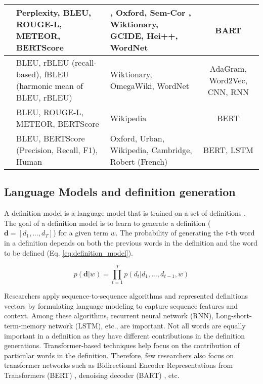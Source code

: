 \begin{longtable}{|c|p{3.5cm}|p{3.5cm}|c|}
    \hline
    \cite{bevilacqua_generationary_2020} & Perplexity, BLEU, ROUGE-L, METEOR, BERTScore                     & \cite{noraset_definition_2016}, Oxford, Sem-Cor \cite{miller_semantic_1993}, Wiktionary, GCIDE, Hei++, WordNet & BART                                     \\
    \hline
    \cite{kabiri_evaluating_2020}        & BLEU, rBLEU (recall-based), fBLEU (harmonic mean of BLEU, rBLEU) & Wiktionary, OmegaWiki, WordNet                                                                                  & AdaGram, Word2Vec, CNN, RNN              \\
    \hline
    \cite{huang_cdm_2021}                & BLEU, ROUGE-L, METEOR, BERTScore                                 & Wikipedia                                                                                                       & BERT                                     \\
    \hline
    \cite{reid_vcdm_2020}                & BLEU, BERTScore (Precision, Recall, F1), Human                   & Oxford, Urban, Wikipedia, Cambridge, Robert (French)                                                            & BERT, LSTM                               \\
    \hline
\end{longtable}

\subsection{Language Models and definition generation}
A definition model is a language model that is trained on a set of definitions
\cite{noraset_definition_2016}. The goal of a definition model is to learn to
generate a definition ($\textbf{d} = [d_1, ..., d_T]$) for a given term $w$. The
probability of generating the $t$-th word in a definition depends on both the
previous words in the definition and the word to be defined (Eq.
\ref{eq:definition_model}).

\begin{equation}
    \label{eq:definition_model}
    p(\textbf{d} | w) = \prod_{t=1}^{T} p(d_t | d_1,...,d_{t-1}, w)
\end{equation}

Researchers apply sequence-to-sequence algorithms and represented definitions
vectors by formulating language modeling to capture sequence features and
context. Among these algorithms, recurrent neural network (RNN),
Long-short-term-memory network (LSTM), etc., are important. Not all words are
equally important in a definition as they have different contributions in the
definition generations. Transformer-based techniques help focus on the
contribution of particular words in the definition. Therefore, few researchers
also focus on transformer networks such as Bidirectional Encoder Representations
from Transformers (BERT) \cite{devlin2018bert}, denoising decoder (BART)
\cite{lewis2019bart}, etc.

